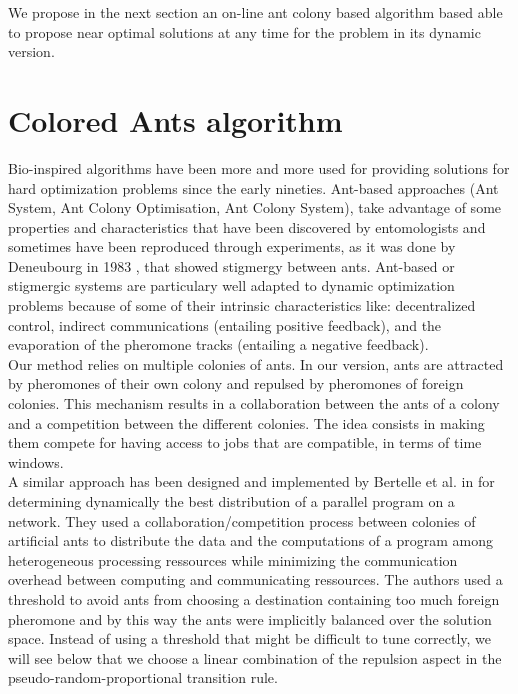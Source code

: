 \documentclass[a4paper,10pt]{article}
\begin{document}

We propose in the next section an on-line ant colony based algorithm based able to propose near optimal solutions at any time for the problem in its dynamic version.

\section{Colored Ants algorithm}\label{sec:ants}

Bio-inspired algorithms have been more and more used for providing solutions for hard optimization problems since the early nineties\cite{Dorigo2006}. Ant-based approaches (Ant System, Ant Colony Optimisation, Ant Colony System), take advantage of some properties and characteristics that have been discovered by entomologists and sometimes have been reproduced through experiments, as it was done by Deneubourg in 1983 \cite{Deneubourg1983}, that showed stigmergy between ants. Ant-based or stigmergic systems are particulary well adapted to dynamic optimization problems because of some of their intrinsic characteristics like: decentralized control, indirect communications (entailing positive feedback), and the evaporation of the pheromone tracks (entailing a negative feedback).\\

Our method relies on multiple colonies of ants. In our version, ants are attracted by pheromones of their own colony and repulsed by pheromones of foreign colonies. This mechanism results in a collaboration between the ants of a colony and a competition between the different colonies. The idea consists in making them compete for having access to jobs that are compatible, in terms of time windows.\\

A similar approach has been designed and implemented by Bertelle et al. in \cite{Bertelle2006,Bertelle2007} for determining dynamically the best distribution of a parallel program on a network. They used a collaboration/competition process between colonies of artificial ants to distribute the data and the computations of a program among heterogeneous processing ressources while minimizing the communication overhead between computing and communicating ressources. The authors used a threshold to avoid ants from choosing a destination containing too much foreign pheromone and by this way the ants were implicitly balanced over the solution space. Instead of using a threshold that might be difficult to tune correctly, we will see below that we choose a linear combination of the repulsion aspect in the pseudo-random-proportional transition rule.\\
\end{document}
